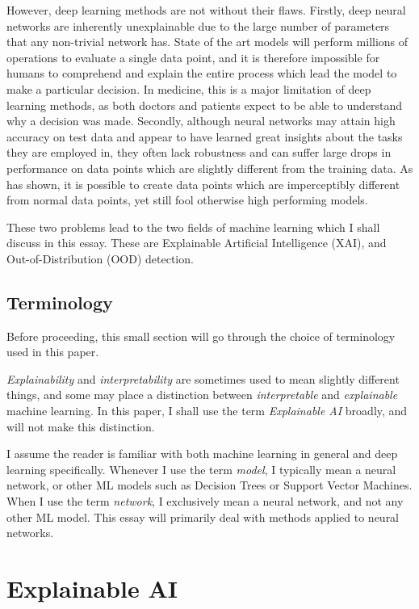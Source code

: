 \documentclass[conference,onecolumn]{IEEEtran}
\begin{document}

However, deep learning methods are not without their flaws. Firstly, deep neural networks are inherently unexplainable due to the large number of parameters that any non-trivial network has. State of the art models will perform millions of operations to evaluate a single data point, and it is therefore impossible for humans to comprehend and explain the entire process which lead the model to make a particular decision. In medicine, this is a major limitation of deep learning methods, as both doctors and patients expect to be able to understand why a decision was made. Secondly, although neural networks may attain high accuracy on test data and appear to have learned great insights about the tasks they are employed in, they often lack robustness and can suffer large drops in performance on data points which are slightly different from the training data. As \cite{intriguing} has shown, it is possible to create data points which are imperceptibly different from normal data points, yet still fool otherwise high performing models.

These two problems lead to the two fields of machine learning which I shall discuss in this essay. These are Explainable Artificial Intelligence (XAI), and Out-of-Distribution (OOD) detection.

\subsection{Terminology}

Before proceeding, this small section will go through the choice of terminology used in this paper.

{\it Explainability} and {\it interpretability} are sometimes used to mean slightly different things, and some may place a distinction between {\it interpretable} and {\it explainable} machine learning. In this paper, I shall use the term {\it Explainable AI} broadly, and will not make this distinction.

I assume the reader is familiar with both machine learning in general and deep learning specifically. Whenever I use the term {\it model}, I typically mean a neural network, or other ML models such as Decision Trees or Support Vector Machines. When I use the term {\it network}, I exclusively mean a neural network, and not any other ML model. This essay will primarily deal with methods applied to neural networks.

\section{Explainable AI} \label{xai_intro}
\end{document}
